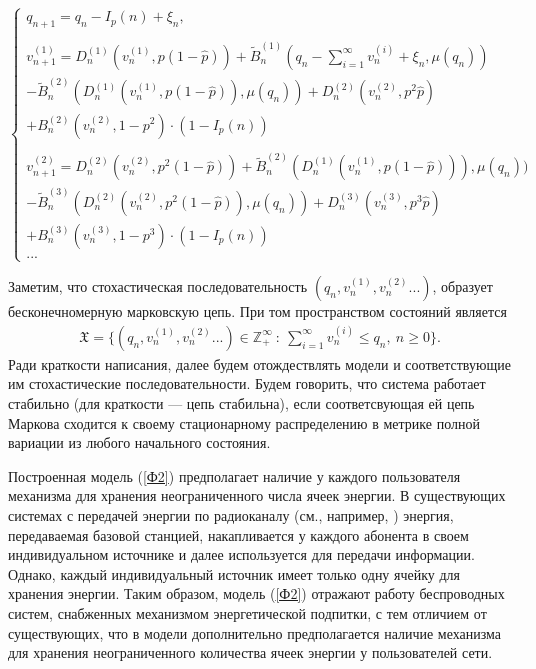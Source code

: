 \documentclass[10pt, reqno]{amsart}
\begin{document}
\small
\begin{equation*}
\begin{cases}
q_{n+1} = q_{n} − I_{p}(n) + \xi_{n}, \\\\
v_{n+1}^{(1)} = D_{n}^{(1)}(v_{n}^{(1)}, p(1-\hat{p})) + \widetilde{B}_{n}^{(1)}(q_{n} − \sum_{i=1}^{\infty}v_{n}^{(i)} + \xi_{n}, \mu(q_{n})) \\- \widetilde{B}_{n}^{(2)}(D_{n}^{(1)}(v_{n}^{(1)}, p(1-\hat{p})), \mu(q_{n})) + D_{n}^{(2)}(v_{n}^{(2)}, p^{2}\hat{p}) \\+ B_{n}^{(2)}(v_{n}^{(2)}, 1-p^{2})\cdot(1-I_{p}(n))\\\\
v_{n+1}^{(2)} = D_{n}^{(2)}(v_{n}^{(2)}, p^{2}(1-\hat{p})) + \widetilde{B}_{n}^{(2)}(D_{n}^{(1)}(v_{n}^{(1)}, p(1-\hat{p}))), \mu(q_{n})) \\- \widetilde{B}_{n}^{(3)}(D_{n}^{(2)}(v_{n}^{(2)}, p^{2}(1-\hat{p})), \mu(q_{n})) + D_{n}^{(3)}(v_{n}^{(3)}, p^{3}\hat{p}) \\+ B_{n}^{(3)}(v_{n}^{(3)}, 1-p^{3})\cdot(1-I_{p}(n))\\
...
\end{cases}
\tag{M2}
\label{Ф2}
\end{equation*}
\normalsize

Заметим, что стохастическая последовательность $(q_{n}, v^{(1)}_{n}, v^{(2)}_{n}...)$, образует бесконечномерную марковскую цепь. При том пространством состояний является
\begin{align}
    \mathfrak{X} = \{(q_{n}, v^{(1)}_{n}, v^{(2)}_{n}...) \in \mathbb{Z}_{+}^{\infty} \: : \: \sum_{i=1}^{\infty}v^{(i)}_{n} \leq q_{n}, \: n \geq 0\}.
    \label{State_space}
\end{align}
Ради краткости написания, далее будем отождествлять модели и соответствующие им стохастические последовательности. Будем говорить, что система работает стабильно (для краткости --- цепь стабильна), если соответсвующая ей цепь Маркова сходится к своему стационарному распределению в метрике полной вариации из любого начального состояния.

Построенная модель (\ref{Ф2}) предполагает наличие у каждого пользователя механизма для хранения неограниченного числа ячеек энергии. В существующих системах с передачей энергии по радиоканалу (см., например, \cite{Example_of_applying_Xun_Zhou}) энергия, передаваемая базовой станцией, накапливается у каждого абонента в своем индивидуальном источнике и далее используется для передачи информации. Однако, каждый индивидуальный источник имеет только одну ячейку для хранения энергии. Таким образом, модель (\ref{Ф2}) отражают работу беспроводных систем, снабженных механизмом энергетической подпитки, с тем отличием от существующих, что в модели дополнительно предполагается наличие механизма для хранения неограниченного количества ячеек энергии у пользователей сети. 
\end{document}
